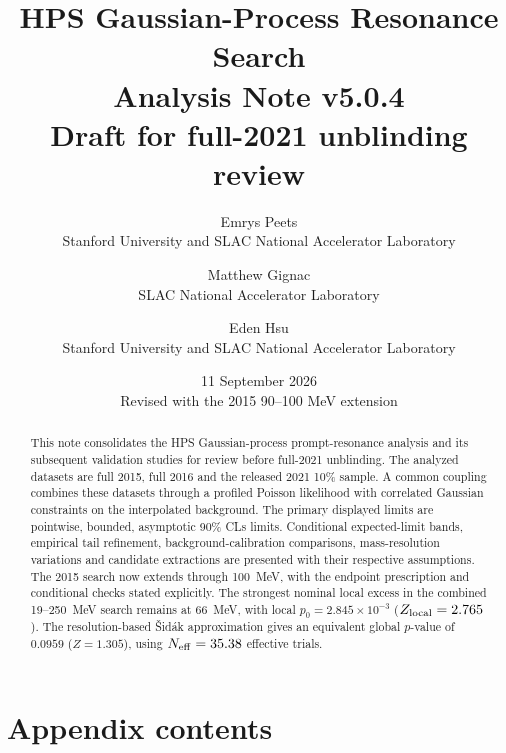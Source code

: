 \documentclass[11pt]{article}
\title{HPS Gaussian-Process Resonance Search\\[0.5em]
\large Analysis Note v5.0.4\\Draft for full-2021 unblinding review}
\author{Emrys Peets\\Stanford University and SLAC National Accelerator Laboratory
\and Matthew Gignac\\SLAC National Accelerator Laboratory
\and Eden Hsu\\Stanford University and SLAC National Accelerator Laboratory}
\date{11 September 2026\\\normalsize Revised with the 2015 90--100 MeV extension}
\makeatletter
\def\CLs{CLs}%
\newcommand{\CLs}{CL$_\mathrm{s}$}
\newcommand{\startappendixcontents}{%
\let\vfiveoriginaladdcontentsline\addcontentsline
\renewcommand{\addcontentsline}[3]{%
\vfiveoriginaladdcontentsline{##1}{##2}{##3}%
\def\vfivefirst{##1}\def\vfivetoc{toc}%
\ifx\vfivefirst\vfivetoc\vfiveoriginaladdcontentsline{apc}{##2}{##3}\fi}}
\newcommand{\appendixcontents}{\section*{Appendix contents}{\setcounter{tocdepth}{2}\@starttoc{apc}}}
\makeatother
\begin{document}
\maketitle
\begin{abstract}
This note consolidates the HPS Gaussian-process prompt-resonance analysis and
its subsequent validation studies for review before full-2021 unblinding.
The analyzed datasets are full 2015, full 2016 and the released 2021 10\% sample.
A common coupling combines these datasets through a profiled Poisson
likelihood with correlated Gaussian constraints on the interpolated background.
The primary displayed limits are pointwise, bounded, asymptotic 90\% \CLs{}
limits. Conditional expected-limit bands, empirical tail refinement,
background-calibration comparisons, mass-resolution variations and candidate
extractions are presented with their respective assumptions.
The 2015 search now extends through 100~MeV, with the endpoint prescription
and conditional checks stated explicitly. The strongest nominal local excess
in the combined 19--250~MeV search remains at 66~MeV,
with local $p_0=2.845\times10^{-3}$ ($Z_{\rm local}=2.765$).
The resolution-based \v{S}id\'ak approximation gives an equivalent global
$p$-value of $0.0959$ ($Z=1.305$), using $N_{\rm eff}=35.38$ effective trials.
\end{abstract}
\clearpage{\small\tableofcontents}
\clearpage

\FloatBarrier\clearpage

\FloatBarrier\clearpage

\FloatBarrier\clearpage



\FloatBarrier\clearpage

\FloatBarrier\clearpage


\FloatBarrier\clearpage

\FloatBarrier\clearpage
\appendix
{}
\startappendixcontents

\FloatBarrier\clearpage
{\footnotesize\appendixcontents}
\clearpage

\FloatBarrier\clearpage

\FloatBarrier\clearpage

\FloatBarrier\clearpage

\FloatBarrier\clearpage

\FloatBarrier\clearpage

\FloatBarrier\clearpage

\clearpage

\clearpage

\FloatBarrier\clearpage

\FloatBarrier\clearpage

\FloatBarrier\clearpage
\let\addcontentsline\vfiveoriginaladdcontentsline


\end{document}
